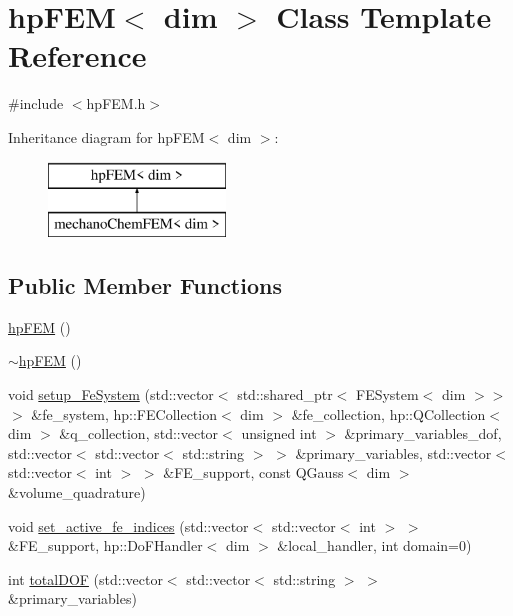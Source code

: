 \section{hp\+F\+EM$<$ dim $>$ Class Template Reference}
\label{classhp_f_e_m}


{\ttfamily \#include $<$hp\+F\+E\+M.\+h$>$}

Inheritance diagram for hp\+F\+EM$<$ dim $>$\+:\begin{figure}[H]
\begin{center}
\leavevmode
\includegraphics[height=2.000000cm]{classhp_f_e_m}
\end{center}
\end{figure}
\subsection*{Public Member Functions}
\begin{DoxyCompactItemize}
\item 
\mbox{\hyperlink{classhp_f_e_m_ac1540fdd371c0b89a90809251b618025}{hp\+F\+EM}} ()
\item 
\mbox{\hyperlink{classhp_f_e_m_acf426058508649734ee9618b5c9148c1}{$\sim$hp\+F\+EM}} ()
\item 
void \mbox{\hyperlink{classhp_f_e_m_afe86b756fb757221f5a8a16c956b7e76}{setup\+\_\+\+Fe\+System}} (std\+::vector$<$ std\+::shared\+\_\+ptr$<$ F\+E\+System$<$ dim $>$$>$ $>$ \&fe\+\_\+system, hp\+::\+F\+E\+Collection$<$ dim $>$ \&fe\+\_\+collection, hp\+::\+Q\+Collection$<$ dim $>$ \&q\+\_\+collection, std\+::vector$<$ unsigned int $>$ \&primary\+\_\+variables\+\_\+dof, std\+::vector$<$ std\+::vector$<$ std\+::string $>$ $>$ \&primary\+\_\+variables, std\+::vector$<$ std\+::vector$<$ int $>$ $>$ \&F\+E\+\_\+support, const Q\+Gauss$<$ dim $>$ \&volume\+\_\+quadrature)
\item 
void \mbox{\hyperlink{classhp_f_e_m_a12205240784051ad249a536cb7ee98d5}{set\+\_\+active\+\_\+fe\+\_\+indices}} (std\+::vector$<$ std\+::vector$<$ int $>$ $>$ \&F\+E\+\_\+support, hp\+::\+Do\+F\+Handler$<$ dim $>$ \&local\+\_\+handler, int domain=0)
\item 
int \mbox{\hyperlink{classhp_f_e_m_a9ceee3881af75e3be863fdb2d1688c0e}{total\+D\+OF}} (std\+::vector$<$ std\+::vector$<$ std\+::string $>$ $>$ \&primary\+\_\+variables)
\end{DoxyCompactItemize}

